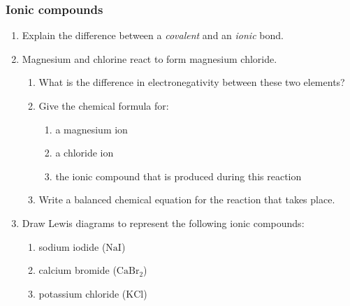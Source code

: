 \label{m38684*secfhsst!!!underscore!!!id522}
            \subsubsection{  Ionic compounds
        }
            \nopagebreak
            
        \label{m38684*id142562}\begin{enumerate}[noitemsep, label=\textbf{\arabic*}. ] 
            \label{m38684*uid57}\item Explain the difference between a \textsl{covalent} and an \textsl{ionic} bond.\newline
            
\label{m38684*uid58}\item Magnesium and chlorine react to form magnesium chloride.
\label{m38684*id142602}\begin{enumerate}[noitemsep, label=\textbf{\alph*}. ] 
            \label{m38684*uid59}\item What is the difference in electronegativity between these two elements?
\label{m38684*uid60}\item Give the chemical formula for:
\label{m38684*id142630}\begin{enumerate}[noitemsep, label=\textbf{\roman*}. ] 
            \label{m38684*uid61}\item a magnesium ion
\label{m38684*uid62}\item a chloride ion
\label{m38684*uid63}\item the ionic compound that is produced during this reaction
\end{enumerate}
        \label{m38684*uid64}\item Write a balanced chemical equation for the reaction that takes place.
\end{enumerate}
        \label{m38684*uid65}\item Draw Lewis diagrams to represent the following ionic compounds:
\label{m38684*id142697}\begin{enumerate}[noitemsep, label=\textbf{\alph*}. ] 
            \label{m38684*uid66}\item sodium iodide (\begin{math}\mathrm{NaI}\end{math})
\label{m38684*uid67}\item calcium bromide (\begin{math}\mathrm{CaBr}{}_{2}\end{math})
\label{m38684*uid68}\item potassium chloride (\begin{math}\mathrm{KCl}\end{math})
\end{enumerate}
        \end{enumerate}
        
